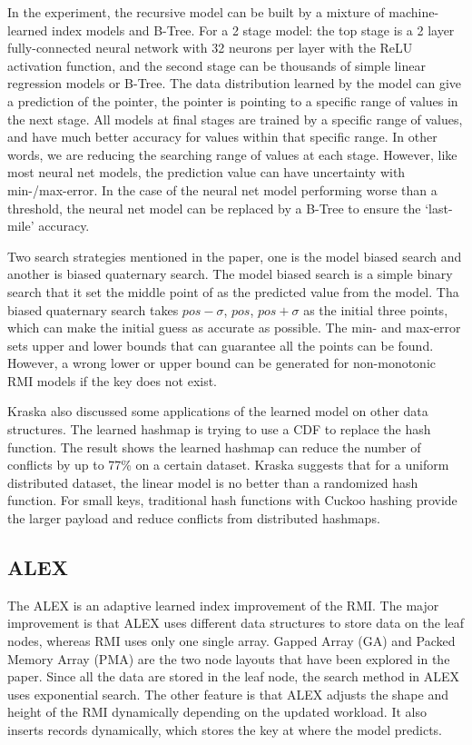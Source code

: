 In the experiment, the recursive model can be built by a mixture of machine-learned index models and B-Tree. For a 2 stage model: the top stage is a 2 layer fully-connected neural network with 32 neurons per layer with the ReLU activation function, and the second stage can be thousands of simple linear regression models or B-Tree. The data distribution learned by the model can give a prediction of the pointer, the pointer is pointing to a specific range of values in the next stage. All models at final stages are trained by a specific range of values, and have much better accuracy for values within that specific range. In other words, we are reducing the searching range of values at each stage. However, like most neural net models, the prediction value can have uncertainty with min-/max-error. In the case of the neural net model performing worse than a threshold, the neural net model can be replaced by a B-Tree to ensure the ‘last-mile’ accuracy. 

Two search strategies mentioned in the paper, one is the model biased search and another is biased quaternary search. The model biased search is a simple binary search that it set the middle point of as the predicted value from the model. Tha biased quaternary search takes ${pos - \sigma}$, ${pos}$, ${pos + \sigma}$ as the initial three points, which can make the initial guess as accurate as possible. The min- and max-error sets upper and lower bounds that can guarantee all the points can be found. However, a wrong lower or upper bound can be generated for non-monotonic RMI models if the key does not exist. 

Kraska also discussed some applications of the learned model on other data structures.  The learned hashmap is trying to use a CDF to replace the hash function. The result shows the learned hashmap can reduce the number of conflicts by up to 77\% on a certain dataset. Kraska suggests that for a uniform distributed dataset, the linear model is no better than a randomized hash function. For small keys, traditional hash functions with Cuckoo hashing provide the larger payload and reduce conflicts from distributed hashmaps. 



\subsection{ALEX}
The ALEX \cite{Ding:2020wo} is an adaptive learned index improvement of the RMI. The major improvement is that ALEX uses different data structures to store data on the leaf nodes, whereas RMI uses only one single array. Gapped Array (GA) and Packed Memory Array (PMA) are the two node layouts that have been explored in the paper. Since all the data are stored in the leaf node, the search method in ALEX uses exponential search. The other feature is that ALEX adjusts the shape and height of the RMI dynamically depending on the updated workload. It also inserts records dynamically, which stores the key at where the model predicts. 


